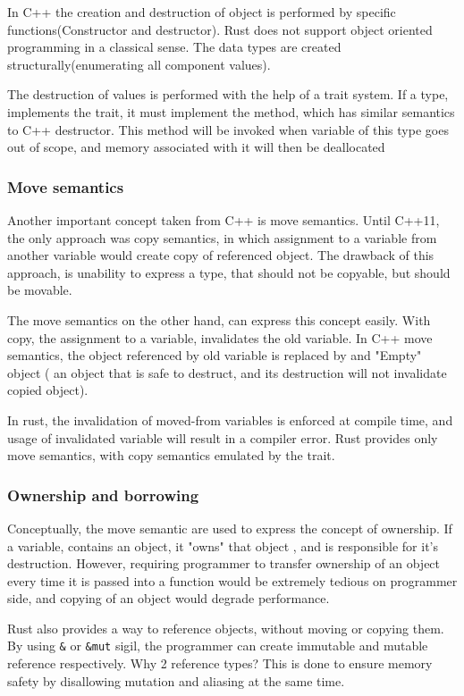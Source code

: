 In C++ the creation and destruction of object is performed by specific functions(Constructor and destructor). Rust does
not support object oriented programming in a classical sense. The data types are created structurally(enumerating all component values).

The destruction of values is performed with the help of a trait system. If a type, implements the  trait,
it must implement the  method, which has similar semantics to C++ destructor. This method will be invoked
when variable of this type goes out of scope, and memory associated with it will then be deallocated

\subsubsection{Move semantics}
Another important concept taken from C++ is move semantics. Until C++11, the only approach was copy semantics, in which
assignment to a variable from another variable would create copy of referenced object.
The drawback of this approach, is unability to express a type, that should not be copyable, but should be movable.

The move semantics on the other hand, can express this concept easily. With copy, the assignment to a variable, invalidates the
old variable. In C++ move semantics, the object referenced by old variable is replaced by and "Empty" object ( an object
that is safe to destruct, and its destruction will not invalidate copied object).

In rust, the invalidation of moved-from variables is enforced at compile time, and usage of invalidated variable will result in a
compiler error. Rust provides only move semantics, with copy semantics emulated by the  trait.

\subsubsection{Ownership and borrowing}
Conceptually, the move semantic are used to express the concept of ownership. If a variable, contains an object, it "owns"
that object , and is responsible for it's destruction. However, requiring programmer to transfer ownership of an object every time
it is passed into a function would be extremely tedious on programmer side, and copying of an object would degrade performance.

Rust also provides a way to reference objects, without moving or copying them. By using \verb|&| or
\verb|&mut| sigil, the programmer can create immutable and mutable reference respectively. Why 2 reference types? This is
done to ensure memory safety by disallowing mutation and aliasing at the same time.

